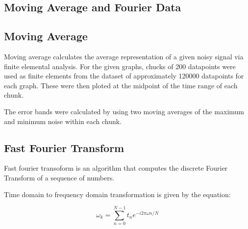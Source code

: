 \documentclass[journal]{Imperial_lab_report}
\begin{document}
\begin{appendices}
        \section{Moving Average and Fourier Data}
        \subsection{Moving Average}
        Moving average calculates the average representation of a given noisy signal via finite elemental analysis. For the given graphs, chucks of 200 datapoints were used as finite elements from the dataset of approximately 120000 datapoints for each graph. These were then ploted at the midpoint of the time range of each chunk.

        The error bands were calculated by using two moving averages of the maximum and minimum noise within each chunk. 

        \subsection{Fast Fourier Transform}

        Fast fourier transoform is an algorithm that computes the discrete Fourier Transform of a sequence of numbers.

        Time domain to frequency domain transformation is given by the equation:

        \begin{equation}
            \omega_k = \sum_{n = 0}^{N-1}t_n{e^{-i2\pi{\omega{n}}/N}} 
        \end{equation}


\end{appendices}
\end{document}
